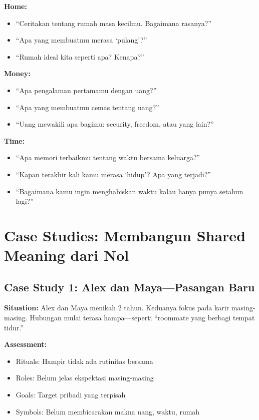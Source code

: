 \begin{tipbox}
\textbf{Home:}
\begin{itemize}
    \item ``Ceritakan tentang rumah masa kecilmu. Bagaimana rasanya?''
    \item ``Apa yang membuatmu merasa `pulang'?''
    \item ``Rumah ideal kita seperti apa? Kenapa?''
\end{itemize}

\textbf{Money:}
\begin{itemize}
    \item ``Apa pengalaman pertamamu dengan uang?''
    \item ``Apa yang membuatmu cemas tentang uang?''
    \item ``Uang mewakili apa bagimu: security, freedom, atau yang lain?''
\end{itemize}

\textbf{Time:}
\begin{itemize}
    \item ``Apa memori terbaikmu tentang waktu bersama keluarga?''
    \item ``Kapan terakhir kali kamu merasa `hidup'? Apa yang terjadi?''
    \item ``Bagaimana kamu ingin menghabiskan waktu kalau hanya punya setahun lagi?''
\end{itemize}
\end{tipbox}

\section{Case Studies: Membangun Shared Meaning dari Nol}

\subsection{Case Study 1: Alex dan Maya---Pasangan Baru}

\begin{praktikbox}[Background]
\textbf{Situation:} Alex dan Maya menikah 2 tahun. Keduanya fokus pada karir masing-masing. Hubungan mulai terasa hampa---seperti ``roommate yang berbagi tempat tidur.''

\textbf{Assessment:}
\begin{itemize}
    \item Rituals: Hampir tidak ada rutinitas bersama
    \item Roles: Belum jelas ekspektasi masing-masing
    \item Goals: Target pribadi yang terpisah
    \item Symbols: Belum membicarakan makna uang, waktu, rumah
\end{itemize}
\end{praktikbox}


